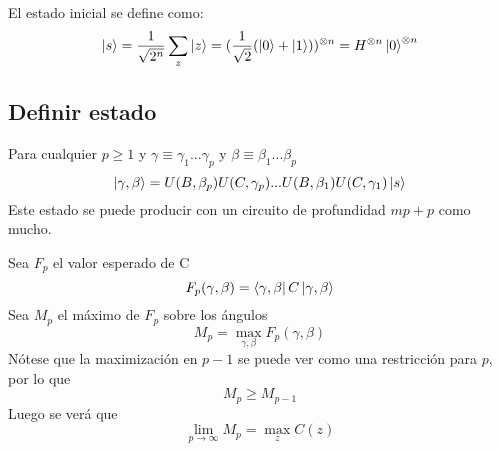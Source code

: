 \documentclass{article}
\begin{document}
El estado inicial se define como:
\[
  \ket{s} = \frac{1}{\sqrt{2^n}} \sum_z\ket{z}
  = (\frac{1}{\sqrt{2}} (\ket{0} + \ket{1}))^{\otimes n}
  = H^{\otimes n} \ket{0}^{\otimes n}
\]

\subsection{Definir estado}
Para cualquier $p \geq 1$ y $\gamma \equiv \gamma_1 ... \gamma_p$ y $\beta \equiv \beta_1 ... \beta_p$
\[
  \ket{\gamma, \beta} = U(B, \beta_p)U(C, \gamma_p) ... U(B, \beta_1)U(C, \gamma_1)\ket{s}
\]
Este estado se puede producir con un circuito de profundidad $mp + p$ como mucho.

Sea $F_p$ el valor esperado de C
\[ F_p(\gamma, \beta) = \bra{\gamma, \beta}C\ket{\gamma, \beta} \]
Sea $M_p$ el máximo de $F_p$ sobre los ángulos
\[ M_p = \max_{\gamma, \beta} F_p(\gamma, \beta) \]
Nótese que la maximización en $p-1$ se puede ver como una restricción para $p$, por lo que
\[ M_p \geq M_{p-1} \]
Luego se verá que
\[ \lim_{p \rightarrow \infty} M_p = \max_z C(z) \]
\end{document}
